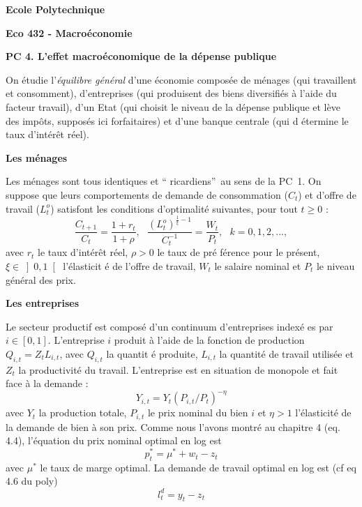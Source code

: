 \documentclass[a4paper,11pt]{article}
\begin{document}
\begin{center}
\textbf{Ecole Polytechnique}

\bigskip

\textbf{Eco 432 - Macro\'{e}conomie}

\bigskip

\textbf{PC 4. L'effet macro\'{e}conomique de la d\'{e}pense publique}
\end{center}

\bigskip

On \'{e}tudie l'\textit{\'{e}quilibre g\'{e}n\'{e}ral} d'une \'{e}conomie
compos\'{e}e de m\'{e}nages (qui travaillent et consomment), d'entreprises
(qui produisent des biens diversifi\'{e}s \`{a} l'aide du facteur travail),
d'un Etat (qui choisit le niveau de la d\'{e}pense publique et l\`{e}ve des
imp\^{o}ts, suppos\'{e}s ici forfaitaires) et d'une banque centrale (qui d%
\'{e}termine le taux d'int\'{e}r\^{e}t r\'{e}el).

\bigskip

\noindent \textbf{Les m\'{e}nages}

Les m\'{e}nages sont tous identiques et \textquotedblleft
ricardiens\textquotedblright\ au sens de la PC\ 1. On suppose que leurs
comportements de demande de consommation ($C_{t}$) et d'offre de travail ($%
L_{t}^{o}$) satisfont les conditions d'optimalit\'{e} suivantes, pour tout $%
t\geq 0$ : 
\begin{equation*}
\frac{C_{t+1}}{C_{t}}=\frac{1+r_{t}}{1+\rho },\ \ \ \frac{\left(
L_{t}^{o}\right) ^{\frac{1}{\xi }-1}}{C_{t}^{-1}}=\frac{W_{t}}{P_{t}},\ \ \
k=0,1,2,...,
\end{equation*}%
avec $r_{t}$ le taux d'int\'{e}r\^{e}t r\'{e}el, $\rho >0$ le taux de pr\'{e}%
f\'{e}rence pour le pr\'{e}sent, $\xi \in \left] 0,1\right[ $ l'\'{e}lasticit%
\'{e} de l'offre de travail, $W_{t}$ le salaire nominal et $P_{t}$ le niveau
g\'{e}n\'{e}ral des prix.

\bigskip

\noindent \textbf{Les entreprises}

Le secteur productif est compos\'{e} d'un continuum d'entreprises index\'{e}%
es par $i\in \left[ 0,1\right] $. L'entreprise $i$ produit \`{a} l'aide de
la fonction de production $Q_{i,t}=Z_{t}L_{i,t}$, avec $Q_{i,t}$ la quantit%
\'{e} produite, $L_{i,t}$ la quantit\'{e} de travail utilis\'{e}e et $Z_{t}$
la productivit\'{e} du travail. L'entreprise est en situation de monopole et
fait face \`{a} la demande :%
\begin{equation*}
Y_{i,t}=Y_{t}\left( P_{i,t}/P_{t}\right) ^{-\eta }
\end{equation*}%
avec $Y_{t}$ la production totale, $P_{i,t}$ le prix nominal du bien $i$ et $%
\eta >1$ l'\'{e}lasticit\'{e} de la demande de bien \`{a} son prix. Comme nous l'avons montr\'{e} au chapitre 4 (eq. 4.4), l'\'{e}quation du prix nominal optimal en log est 
\begin{equation*}
p^{\ast}_{t}=\mu^{\ast} +w_t-z_t
\end{equation*}%
avec $\mu^{\ast}$ le taux de marge optimal. La demande de travail optimal en log est (cf eq 4.6 du poly)
\begin{equation*}
l_{t}^{d}=y_{t}-z_{t}
\end{equation*} 
\end{document}
